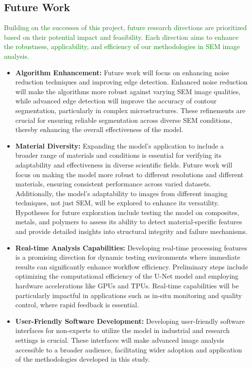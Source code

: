 \documentclass[preprint,12pt]{elsarticle}
\begin{document}
\subsection{Future Work}
\textcolor{green}{Building on the successes of this project, future research directions are prioritized based on their potential impact and feasibility. Each direction aims to enhance the robustness, applicability, and efficiency of our methodologies in SEM image analysis.}

\begin{itemize}
    \item \textbf{Algorithm Enhancement:} Future work will focus on enhancing noise reduction techniques and improving edge detection. Enhanced noise reduction will make the algorithms more robust against varying SEM image qualities, while advanced edge detection will improve the accuracy of contour segmentation, particularly in complex microstructures. These refinements are crucial for ensuring reliable segmentation across diverse SEM conditions, thereby enhancing the overall effectiveness of the model.

    \item \textbf{Material Diversity:} Expanding the model’s application to include a broader range of materials and conditions is essential for verifying its adaptability and effectiveness in diverse scientific fields. Future work will focus on making the model more robust to different resolutions and different materials, ensuring consistent performance across varied datasets. Additionally, the model’s adaptability to images from different imaging techniques, not just SEM, will be explored to enhance its versatility. Hypotheses for future exploration include testing the model on composites, metals, and polymers to assess its ability to detect material-specific features and provide detailed insights into structural integrity and failure mechanisms.

    \item \textbf{Real-time Analysis Capabilities:} Developing real-time processing features is a promising direction for dynamic testing environments where immediate results can significantly enhance workflow efficiency. Preliminary steps include optimizing the computational efficiency of the U-Net model and employing hardware accelerations like GPUs and TPUs. Real-time capabilities will be particularly impactful in applications such as in-situ monitoring and quality control, where rapid feedback is essential.

    \item \textbf{User-Friendly Software Development:} Developing user-friendly software interfaces for non-experts to utilize the model in industrial and research settings is crucial. These interfaces will make advanced image analysis accessible to a broader audience, facilitating wider adoption and application of the methodologies developed in this study.

\end{itemize}
\end{document}
